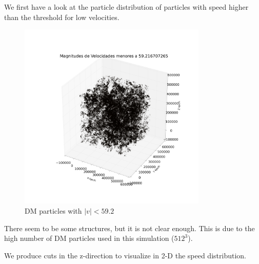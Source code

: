 \documentclass[12pt]{article}
\begin{document}
We first have a look at the particle distribution of particles with speed higher than the
threshold for low velocities.\\
\begin{figure}[ht]
\begin{center}
\includegraphics[width=0.8\textwidth]{graphs/pos_3d_vel_menor_s_smaller.png} %
\caption{DM particles with $|v| < 59.2 $}
\label{fg:3d_thresh_low}
\end{center}
\end{figure}
\FloatBarrier

There seem to be some structures, but it is not clear enough. This is due to the high number of DM particles used in this simulation ($512^3$). 


We produce cuts in the z-direction to visualize in 2-D the speed distribution. \\

\end{document}
